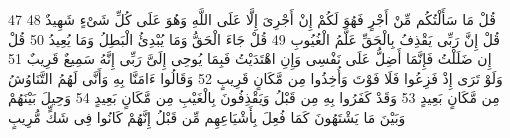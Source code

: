 \documentclass[20pt,a4paper]{article}
\begin{document}
{\tiny\colorbox{cl_aya}{47}} قُلْ مَا سَأَلْتُكُم مِّنْ أَجْرٍ فَهُوَ لَكُمْ إِنْ أَجْرِىَ إِلَّا عَلَى اللَّهِ وَهُوَ عَلَى كُلِّ شَىْءٍ شَهِيدٌ
{\tiny\colorbox{cl_aya}{48}} قُلْ إِنَّ رَبِّى يَقْذِفُ بِالْحَقِّ عَلَّمُ الْغُيُوبِ
{\tiny\colorbox{cl_aya}{49}} قُلْ جَاءَ الْحَقُّ وَمَا يُبْدِئُ الْبَطِلُ وَمَا يُعِيدُ
{\tiny\colorbox{cl_aya}{50}} قُلْ إِن ضَلَلْتُ فَإِنَّمَا أَضِلُّ عَلَى نَفْسِى وَإِنِ اهْتَدَيْتُ فَبِمَا يُوحِى إِلَىَّ رَبِّى إِنَّهُ سَمِيعٌ قَرِيبٌ
{\tiny\colorbox{cl_aya}{51}} وَلَوْ تَرَى إِذْ فَزِعُوا فَلَا فَوْتَ وَأُخِذُوا مِن مَّكَانٍ قَرِيبٍ
{\tiny\colorbox{cl_aya}{52}} وَقَالُوا ءَامَنَّا بِهِ وَأَنَّى لَهُمُ التَّنَاوُشُ مِن مَّكَانٍ بَعِيدٍ
{\tiny\colorbox{cl_aya}{53}} وَقَدْ كَفَرُوا بِهِ مِن قَبْلُ وَيَقْذِفُونَ بِالْغَيْبِ مِن مَّكَانٍ بَعِيدٍ
{\tiny\colorbox{cl_aya}{54}} وَحِيلَ بَيْنَهُمْ وَبَيْنَ مَا يَشْتَهُونَ كَمَا فُعِلَ بِأَشْيَاعِهِم مِّن قَبْلُ إِنَّهُمْ كَانُوا فِى شَكٍّ مُّرِيبٍ
\end{document}
